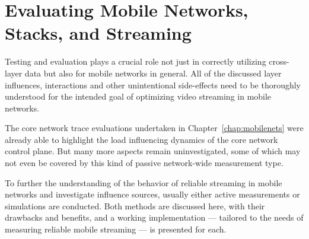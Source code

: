 \chapter{Evaluating Mobile Networks, Stacks, and Streaming}
\label{chap:mobilestreaming-measurements}

Testing and evaluation plays a crucial role not just in correctly utilizing cross-layer data but also for mobile networks in general. All of the discussed layer influences, interactions and other unintentional side-effects need to be thoroughly understood for the intended goal of optimizing video streaming in mobile networks.

The core network trace evaluations undertaken in Chapter~\ref{chap:mobilenets} were already able to highlight the load influencing dynamics of the core network control plane. But many more aspects remain uninvestigated, some of which may not even be covered by this kind of passive network-wide measurement type.

To further the understanding of the behavior of reliable streaming in mobile networks and investigate influence sources, usually either active measurements or simulations are conducted. Both methods are discussed here, with their drawbacks and benefits, and a working implementation --- tailored to the needs of measuring reliable mobile streaming --- is presented for each.


















